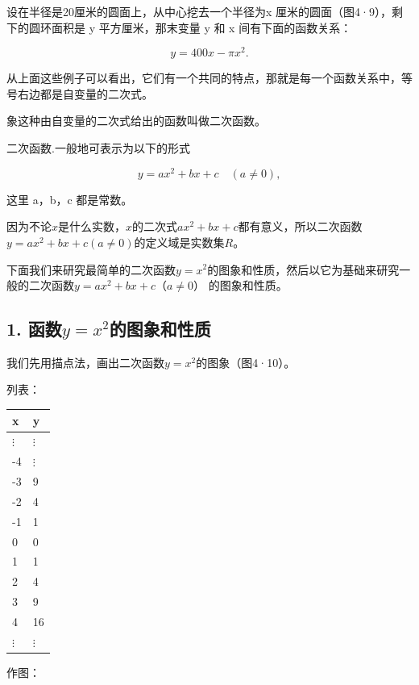 设在半径是20厘米的圆面上，从中心挖去一个半径为x 厘米的圆面（图4·9），剩下的圆环面积是 y 平方厘米，那末变量 y 和 x 间有下面的函数关系：

\[
y = 400 x - \pi x^{2}. \tag {3}
\]

从上面这些例子可以看出，它们有一个共同的特点，那就是每一个函数关系中，等号右边都是自变量的二次式。

象这种由自变量的二次式给出的函数叫做二次函数。

二次函数.一般地可表示为以下的形式

\[
y = a x^{2} + b x + c \quad (a \neq 0),
\]

这里 a，b，c 都是常数。

因为不论\(x\)是什么实数，\(x\)的二次式\(ax^2 + bx + c\)都有意义，所以二次函数\(y = ax^2 + bx + c (a \neq 0)\)的定义域是实数集\(R\)。

下面我们来研究最简单的二次函数\(y = x^2\)的图象和性质，然后以它为基础来研究一般的二次函数\(y = ax^2 + bx + c\)（\(a \neq 0\)）
的图象和性质。

\subsection{\texorpdfstring{1. 函数\(y = x^2\)的图象和性质}{1. 函数y = x\^{}2的图象和性质}}

我们先用描点法，画出二次函数\(y = x^2\)的图象（图4·10）。

列表：

{\def\LTcaptype{none} %
\begin{longtable}[]{@{}ll@{}}
\toprule\noalign{}
x & y \\
\midrule\noalign{}
\endhead
\bottomrule\noalign{}
\endlastfoot
\(\vdots\) & \(\vdots\) \\
-4 & \(\vdots\) \\
-3 & 9 \\
-2 & 4 \\
-1 & 1 \\
0 & 0 \\
1 & 1 \\
2 & 4 \\
3 & 9 \\
4 & 16 \\
\(\vdots\) & \(\vdots\) \\
\end{longtable}
}

作图：

